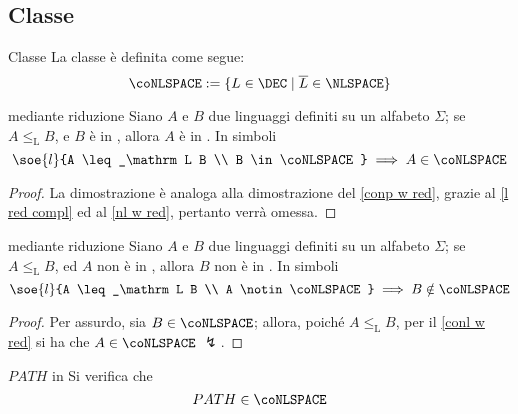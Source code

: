 \documentclass[a4paper, 12pt]{report}
\begin{document}
    \subsection{Classe \coNLSPACE}
    
    \begin{frameddefn}[label={conl def}]{Classe \coNLSPACE}
        La classe \coNLSPACE è definita come segue: $$\coNLSPACE := \{L \in \DEC \mid \overline L \in \NLSPACE\}$$
    \end{frameddefn}

    \begin{framedthm}[label={conl w red}]{\coNLSPACE mediante riduzione}
        Siano $A$ e $B$ due linguaggi definiti su un alfabeto $\Sigma$; se $A \leq_\mathrm L B$, e $B$ è in \coNLSPACE, allora $A$ è in \coNLSPACE. In simboli $$\soe{l}{A \leq_\mathrm L B \\ B \in \coNLSPACE} \implies A \in \coNLSPACE$$
    \end{framedthm}

    \begin{proof}
        La dimostrazione è analoga alla dimostrazione del \cref{conp w red}, grazie al \cref{l red compl} ed al \cref{nl w red}, pertanto verrà omessa.
    \end{proof}

    \begin{framedcor}[label={conl w red cor}]{\coNLSPACE mediante riduzione}
        Siano $A$ e $B$ due linguaggi definiti su un alfabeto $\Sigma$; se $A \leq_\mathrm L B$, ed $A$ non è in \coNLSPACE, allora $B$ non è in \coNLSPACE. In simboli $$\soe{l}{A \leq_\mathrm L B \\ A \notin \coNLSPACE} \implies B \notin \coNLSPACE$$
    \end{framedcor}

    \begin{proof}
        Per assurdo, sia $B \in \coNLSPACE$; allora, poiché $A \leq_\mathrm L B$, per il \cref{conl w red} si ha che $A \in \coNLSPACE$ $\lightning$.
    \end{proof}

    \begin{framedthm}[label={path in conl}]{$PATH$ in \coNLSPACE}
        Si verifica che $$PATH \in \coNLSPACE$$
    \end{framedthm}
\end{document}
